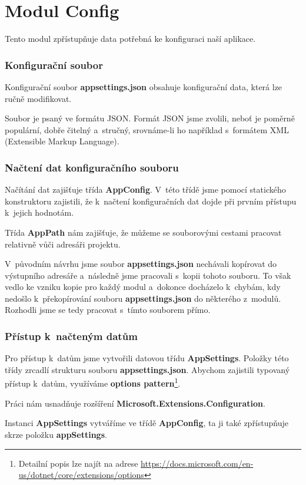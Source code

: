 \section{Modul Config}

Tento modul zpřístupňuje data potřebná ke konfiguraci naší aplikace.


\subsubsection{Konfigurační soubor}

Konfigurační soubor \textbf{appsettings.json} obsahuje konfigurační data, která lze ručně modifikovat.

Soubor je psaný ve formátu JSON. Formát JSON jsme zvolili, neboť je poměrně populární, dobře čitelný a~stručný, srovnáme-li ho například s~formátem XML (Extensible Markup Language).


\subsubsection{Načtení dat konfiguračního souboru}

Načítání dat zajišťuje třída \textbf{AppConfig}. V~této třídě jsme pomocí statického konstruktoru zajistili, že k~načtení konfiguračních dat dojde při prvním přístupu k~jejich hodnotám.

Třída \textbf{AppPath} nám zajišťuje, že můžeme se souborovými cestami pracovat relativně vůči adresáři projektu.

V~původním návrhu jsme soubor \textbf{appsettings.json} nechávali kopírovat do výstupního adresáře a~následně jsme pracovali s~kopii tohoto souboru. To však vedlo ke vzniku kopie pro každý modul a~dokonce docházelo k~chybám, kdy nedošlo k~překopírování souboru \textbf{appsettings.json} do některého z~modulů. Rozhodli jsme se tedy pracovat s~tímto souborem přímo.


\subsubsection{Přístup k~načteným datům}

Pro přístup k~datům jsme vytvořili datovou třídu \textbf{AppSettings}. Položky této třídy zrcadlí strukturu souboru \textbf{appsettings.json}. Abychom zajistili typovaný přístup k~datům, využíváme \textbf{options pattern}\footnote{Detailní popis lze najít na adrese \url{https://docs.microsoft.com/en-us/dotnet/core/extensions/options}}.

Práci nám usnadňuje rozšíření \textbf{Microsoft.Extensions.Configuration}.

Instanci \textbf{AppSettings} vytváříme ve třídě \textbf{AppConfig}, ta ji také zpřístupňuje skrze položku \textbf{appSettings}.
